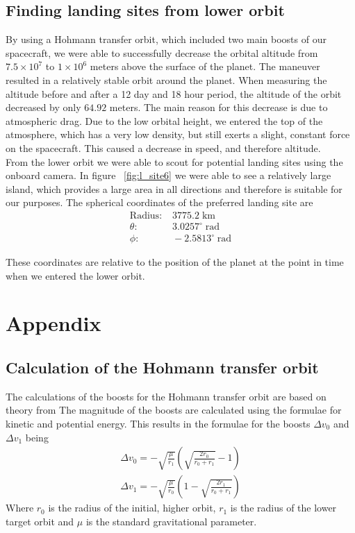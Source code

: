 \documentclass[reprint,english,notitlepage]{revtex4-2}
\begin{document}
\subsection{Finding landing sites from lower orbit}\label{subsec:finding-landing-sites-from-lower-orbit}
    By using a Hohmann transfer orbit, which included two main boosts of our spacecraft, we were able to successfully decrease the orbital altitude from $7.5 \times 10^7$ to $1 \times 10^{6}$ meters above the surface of the planet.
    The maneuver resulted in a relatively stable orbit around the planet.
    When measuring the altitude before and after a 12 day and 18 hour period, the altitude of the orbit decreased by only $64.92$ meters.
    The main reason for this decrease is due to atmospheric drag.
    Due to the low orbital height, we entered the top of the atmosphere, which has a very low density, but still exerts a slight, constant force on the spacecraft.
    This caused a decrease in speed, and therefore altitude.\\

    From the lower orbit we were able to scout for potential landing sites using the onboard camera.
    In figure ~\ref{fig:l_site6} we were able to see a relatively large island, which provides a large area in all directions and therefore is suitable for our purposes.
    The spherical coordinates of the preferred landing site are\\
    \begin{align*}
        \text{Radius}:&\; 3775.2 \;\text{km}\\
        \theta :&\; 3.0257^{\circ} \;\text{rad}\\
        \phi :&\; -2.5813^{\circ} \;\text{rad}
    \end{align*}

    These coordinates are relative to the position of the planet at the point in time when we entered the lower orbit.

\section{Appendix} \label{sec: appendix}
\subsection{Calculation of the Hohmann transfer orbit}\label{subsec:calculation-of-the-hohmann-transfer-orbit}
    The calculations of the boosts for the Hohmann transfer orbit are based on theory from %
    The magnitude of the boosts are calculated using the formulae for kinetic and potential energy.
    This results in the formulae for the boosts $\Delta v_0$ and $\Delta v_1$ being
    \begin{align*}
        \Delta v_0 = -\sqrt{\frac{\mu}{r_1}} \left(\sqrt{\frac{2r_0}{r_0 + r_1}}-1\right)\\
        \Delta v_1 = -\sqrt{\frac{\mu}{r_0}} \left(1-\sqrt{\frac{2r_1}{r_0 + r_1}}\right)
    \end{align*}
    Where $r_0$ is the radius of the initial, higher orbit, $r_1$ is the radius of the lower target orbit and $\mu$ is the standard gravitational parameter.
\end{document}
